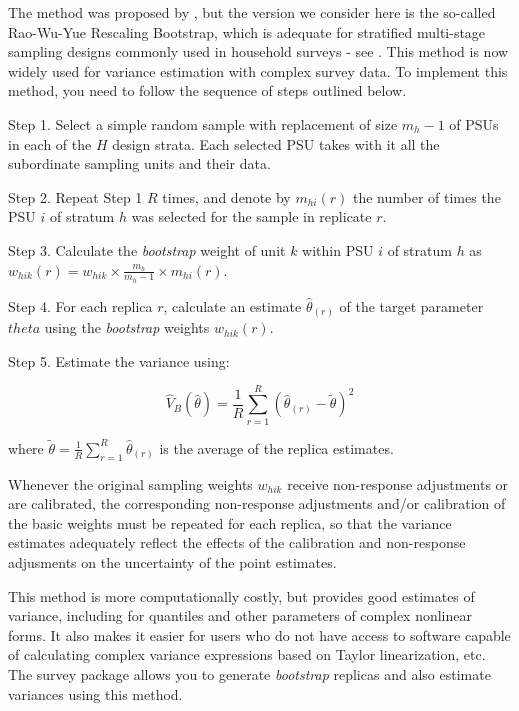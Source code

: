 \documentclass[
  12pt,
]{book}
\begin{document}
The method was proposed by \citet{Efron1979}, but the version we consider here is the so-called Rao-Wu-Yue Rescaling Bootstrap, which is adequate for stratified multi-stage sampling designs commonly used in household surveys - see \citet{Rao1992}. This method is now widely used for variance estimation with complex survey data. To implement this method, you need to follow the sequence of steps outlined below.

Step 1. Select a simple random sample with replacement of size \(m_h - 1\) of PSUs in each of the \(H\) design strata. Each selected PSU takes with it all the subordinate sampling units and their data.

Step 2. Repeat Step 1 \(R\) times, and denote by \(m_{hi}(r)\) the number of times the PSU \(i\) of stratum \(h\) was selected for the sample in replicate \(r\).

Step 3. Calculate the \emph{bootstrap} weight of unit \(k\) within PSU \(i\) of stratum \(h\) as \(w_{hik} (r) = w_{hik} \times \frac {m_h}{m_h - 1} \times m_{hi}(r)\).

Step 4. For each replica \(r\), calculate an estimate \(\widehat \theta_{(r)}\) of the target parameter \(theta\) using the \emph{bootstrap} weights \(w_{hik} (r)\).

Step 5. Estimate the variance using:

\[
\widehat V_{B} \left( \widehat \theta \right) = \frac {1} {R} \sum_{r=1}^R \left( \widehat \theta_{(r)} - \tilde \theta \right)^2
\]

where \(\tilde \theta = \frac 1 R \sum_{r=1}^R \widehat \theta_{(r)}\) is the average of the replica estimates.

Whenever the original sampling weights \(w_{hik}\) receive non-response adjustments or are calibrated, the corresponding non-response adjustments and/or calibration of the basic weights must be repeated for each replica, so that the variance estimates adequately reflect the effects of the calibration and non-response adjusments on the uncertainty of the point estimates.

This method is more computationally costly, but provides good estimates of variance, including for quantiles and other parameters of complex nonlinear forms. It also makes it easier for users who do not have access to software capable of calculating complex variance expressions based on Taylor linearization, etc. The survey package allows you to generate \emph{bootstrap} replicas and also estimate variances using this method.
\end{document}
